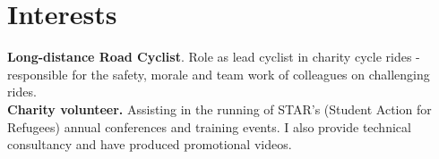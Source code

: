 \documentclass[11pt]{article}
\begin{document}
\section*{Interests}

\textbf{Long-distance Road Cyclist}. Role as lead cyclist in charity cycle rides - responsible for the safety, morale and team work of colleagues on challenging rides.\\
\noindent \textbf{Charity volunteer.} Assisting in the running of STAR's (Student Action for Refugees) annual conferences and training events.
I also provide technical consultancy and have produced promotional videos.

\end{document}
